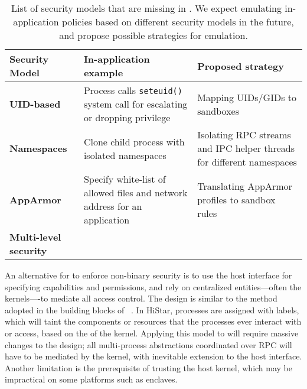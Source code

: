 \begin{table}[t]
\footnotesize
\centering
\begin{tabular}{>{\bf}p{1.2in}>{\raggedright\arraybackslash}p{2.4in}>{\raggedright\arraybackslash}p{2.4in}}
\toprule
{\bf Security Model} & {\bf In-application example} & {\bf Proposed strategy} \\
\midrule
UID-based & Process calls {\tt seteuid()} system call for escalating or dropping privilege & Mapping UIDs/GIDs to sandboxes \\
\midrule
Namespaces & Clone child process with isolated namespaces & Isolating RPC streams and IPC helper threads for different namespaces \\
\midrule
AppArmor & Specify white-list of allowed files and network address for an application & Translating AppArmor profiles to sandbox rules \\
\midrule
Multi-level security &  &  \\
\bottomrule
\end{tabular}
\caption[List of security models to be added in \graphene{} as future works]
{List of security models that are missing in \graphene{}.
We expect emulating in-application policies based on different security models in the future, and propose possible strategies for emulation.
}
\label{tab:future:security}
\end{table}



An alternative for \picoprocs{} to enforce non-binary security
is to use the host interface
for specifying capabilities and permissions,
and rely on centralized entities---often the kernels----to mediate all 
access control.
The design is similar to the method adopted in the building blocks of ~\citep{zeldovich+histar}.
In HiStar, processes are assigned with labels, which will taint the components or resources that the processes ever interact with or access,
based on the  of the kernel.
Applying this model to \graphene{} will require
massive changes to the design;
all multi-process abstractions coordinated over RPC will have to be mediated by the kernel, with inevitable extension to the host interface.
Another limitation is the prerequisite of
trusting the host kernel,
which may be impractical on some platforms such as \sgx{} enclaves.

